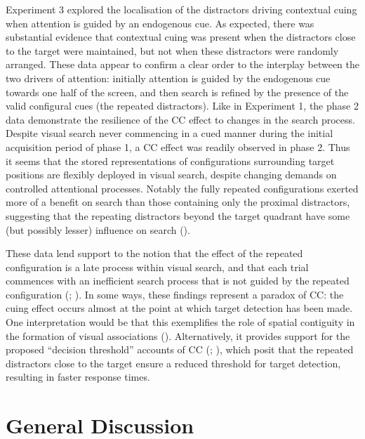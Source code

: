 \documentclass[
  man,
  floatsintext,
  longtable,
  nolmodern,
  notxfonts,
  notimes,
  colorlinks=true,linkcolor=blue,citecolor=blue,urlcolor=blue]{apa7}
\begin{document}
Experiment 3 explored the localisation of the distractors driving
contextual cuing when attention is guided by an endogenous cue. As
expected, there was substantial evidence that contextual cuing was
present when the distractors close to the target were maintained, but
not when these distractors were randomly arranged. These data appear to
confirm a clear order to the interplay between the two drivers of
attention: initially attention is guided by the endogenous cue towards
one half of the screen, and then search is refined by the presence of
the valid configural cues (the repeated distractors). Like in Experiment
1, the phase 2 data demonstrate the resilience of the CC effect to
changes in the search process. Despite visual search never commencing in
a cued manner during the initial acquisition period of phase 1, a CC
effect was readily observed in phase 2. Thus it seems that the stored
representations of configurations surrounding target positions are
flexibly deployed in visual search, despite changing demands on
controlled attentional processes. Notably the fully repeated
configurations exerted more of a benefit on search than those containing
only the proximal distractors, suggesting that the repeating distractors
beyond the target quadrant have some (but possibly lesser) influence on
search ().

These data lend support to the notion that the effect of the repeated
configuration is a late process within visual search, and that each
trial commences with an inefficient search process that is not guided by
the repeated configuration (; ). In some ways, these
findings represent a paradox of CC: the cuing effect occurs almost at
the point at which target detection has been made. One interpretation
would be that this exemplifies the role of spatial contiguity in the
formation of visual associations (). Alternatively, it provides support for the proposed
``decision threshold'' accounts of CC (; ), which posit
that the repeated distractors close to the target ensure a reduced
threshold for target detection, resulting in faster response times.

\section{General Discussion}\label{general-discussion}
\end{document}
